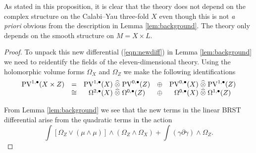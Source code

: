 \documentclass[11pt]{amsart}
\def\PV{{\rm PV}}
\begin{document}
As stated in this proposition, it is clear that the theory does not depend on the complex structure on the Calabi--Yau three-fold $X$ even though this is not {\em a priori} obvious from the description in Lemma \ref{lem:background}. 
The theory only depends on the smooth structure on $M = X \times L$.

\begin{proof}
To unpack this new differential (\ref{eqn:newdiff}) in Lemma \ref{lem:background} we need to reidentify the fields of the eleven-dimensional theory.
Using the holomorphic volume forms $\Omega_X$ and $\Omega_Z$ we make the following identifications
\begin{equation}\label{eqn:decomposevf}
\begin{array}{ccccc}
  \PV^{1,\bu}(X \times Z) & = & \PV^{1,\bu}(X) \; \Hat{\otimes} \; \PV^{0,\bu}(Z) & \oplus & \PV^{0,\bu}(X) \; \Hat{\otimes} \; \PV^{1,\bu}(Z) \\ & \cong & \Omega^{2,\bu}(X) \; \Hat{\otimes} \; \Omega^{0,\bu} (Z) & \oplus & \Omega^{0,\bu}(X) \; \Hat{\otimes} \; \Omega^{1,\bu}(Z) 
\end{array}
\end{equation}


From Lemma \ref{lem:background} we see that the new terms in the linear BRST differential arise from the quadratic terms in the action
\begin{equation}\label{eqn:newterms}
  \int \left[\Omega_Z \vee (\mu \wedge \mu) \right] \wedge (\Omega_Z \wedge \Omega_X) + \int \left(\gamma \partial \gamma\right) \wedge \Omega_Z .
\end{equation}


\end{proof}
\end{document}
